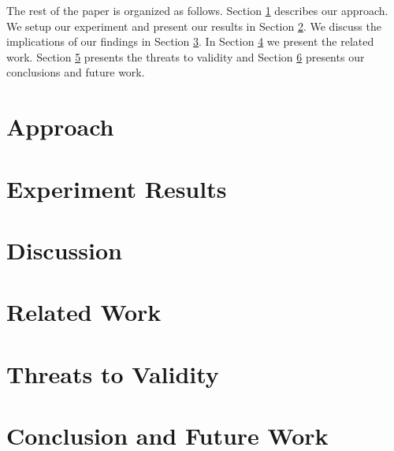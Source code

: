 \documentclass[10pt,journal,compsoc]{IEEEtran}
\begin{document}
The rest of the paper is organized as follows. Section \ref{sec:approach} describes our approach. We setup our experiment and present our
results in Section \ref{sec:case_study_results}. We discuss the implications of our findings in Section \ref{sec:discussion}. In Section \ref{sec:related_work} we present the related work. Section \ref{sec:threats_to_validity} presents the threats to validity and Section \ref{sec:conclusion} presents our conclusions and future work.  

\section{Approach}
\label{sec:approach}


\section{Experiment Results}
\label{sec:case_study_results}


\section{Discussion}
\label{sec:discussion}


\section{Related Work}
\label{sec:related_work}


\section{Threats to Validity}
\label{sec:threats_to_validity}


\section{Conclusion and Future Work}
\label{sec:conclusion}




%
\end{document}
